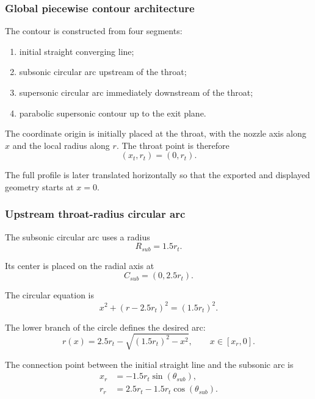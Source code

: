\subsubsection{Global piecewise contour architecture}

The contour is constructed from four segments:
\begin{enumerate}
    \item initial straight converging line;
    \item subsonic circular arc upstream of the throat;
    \item supersonic circular arc immediately downstream of the throat;
    \item parabolic supersonic contour up to the exit plane.
\end{enumerate}

The coordinate origin is initially placed at the throat, with the nozzle axis along $x$ and the local radius along $r$. The throat point is therefore
\begin{equation}
(x_t,r_t)=(0,r_t).
\end{equation}

The full profile is later translated horizontally so that the exported and displayed geometry starts at $x=0$.

\subsubsection{Upstream throat-radius circular arc}

The subsonic circular arc uses a radius
\begin{equation}
R_{sub}=1.5r_t.
\end{equation}

Its center is placed on the radial axis at
\begin{equation}
C_{sub}=(0,2.5r_t).
\end{equation}

The circular equation is
\begin{equation}
x^2+(r-2.5r_t)^2=(1.5r_t)^2.
\end{equation}

The lower branch of the circle defines the desired arc:
\begin{equation}
r(x)=2.5r_t-\sqrt{(1.5r_t)^2-x^2},
\qquad x\in[x_r,0].
\label{eq:sub_arc}
\end{equation}

The connection point between the initial straight line and the subsonic arc is
\begin{align}
x_r &= -1.5r_t\sin(\theta_{sub}),
\label{eq:xr}\\
r_r &= 2.5r_t-1.5r_t\cos(\theta_{sub}).
\label{eq:yr}
\end{align}

